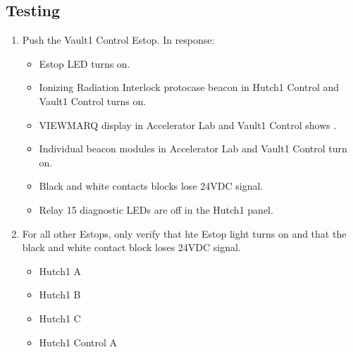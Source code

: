 \documentclass[letterpaper,10pt,english]{sphinxmanual}
\begin{document}
\subsection{Testing}
\label{\detokenize{testing_documentation/e-stop_testing:testing}}\begin{enumerate}
%
\item {} 
\sphinxAtStartPar
Push the Vault\sphinxhyphen{}1 Control E\sphinxhyphen{}stop. In response:
\begin{itemize}
\item {} 
\sphinxAtStartPar
E\sphinxhyphen{}stop LED turns on.

\item {} 
\sphinxAtStartPar
Ionizing Radiation Interlock protocase beacon in Hutch\sphinxhyphen{}1 Control and Vault\sphinxhyphen{}1 Control turns on.

\item {} 
\sphinxAtStartPar
VIEWMARQ display in Accelerator Lab and Vault\sphinxhyphen{}1 Control shows .

\item {} 
\sphinxAtStartPar
Individual  beacon modules in Accelerator Lab and Vault\sphinxhyphen{}1 Control turn on.

\item {} 
\sphinxAtStartPar
Black and white contacts blocks lose 24VDC signal.

\item {} 
\sphinxAtStartPar
Relay 15 diagnostic LEDs are off in the Hutch\sphinxhyphen{}1 panel.

\end{itemize}

\item {} 
\sphinxAtStartPar
For all other E\sphinxhyphen{}stops, only verify that hte E\sphinxhyphen{}stop light turns on and that the black and white contact block loses 24VDC signal.
\begin{itemize}
\item {} 
\sphinxAtStartPar
Hutch\sphinxhyphen{}1 A

\item {} 
\sphinxAtStartPar
Hutch\sphinxhyphen{}1 B

\item {} 
\sphinxAtStartPar
Hutch\sphinxhyphen{}1 C

\item {} 
\sphinxAtStartPar
Hutch\sphinxhyphen{}1 Control A


\end{itemize}
\end{enumerate}
\end{document}
